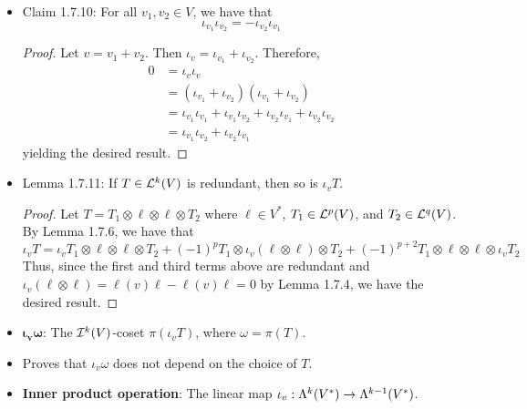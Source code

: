 \documentclass[../notes.tex]{subfiles}
\begin{document}
\begin{itemize}
\begin{proof}
        \begin{equation*}
            \iota_v(\iota_v(T\otimes\ell)) = \iota_v(\iota_vT)\otimes\ell+(-1)^{k-2}\ell(v)\iota_vT+(-1)^{k-1}\ell(v)\iota_vT
        \end{equation*}
        The first term is zero by the inductive hypothesis, and the second two cancel each other out, as desired.
    \end{proof}
    \item Claim 1.7.10: For all $v_1,v_2\in V$, we have that
    \begin{equation*}
        \iota_{v_1}\iota_{v_2} = -\iota_{v_2}\iota_{v_1}
    \end{equation*}
    \begin{proof}
        Let $v=v_1+v_2$. Then $\iota_v=\iota_{v_1}+\iota_{v_2}$. Therefore,
        \begin{align*}
            0 &= \iota_v\iota_v\tag*{Lemma 1.7.8}\\
            &= (\iota_{v_1}+\iota_{v_2})(\iota_{v_1}+\iota_{v_2})\\
            &= \iota_{v_1}\iota_{v_1}+\iota_{v_1}\iota_{v_2}+\iota_{v_2}\iota_{v_1}+\iota_{v_2}\iota_{v_2}\\
            &= \iota_{v_1}\iota_{v_2}+\iota_{v_2}\iota_{v_1}\tag*{Lemma 1.7.8}
        \end{align*}
        yielding the desired result.
    \end{proof}
    \item Lemma 1.7.11: If $T\in\lin[k]{V}$ is redundant, then so is $\iota_vT$.
    \begin{proof}
        Let $T=T_1\otimes\ell\otimes\ell\otimes T_2$ where $\ell\in V^*$, $T_1\in\lin[p]{V}$, and $T_2\in\lin[q]{V}$. By Lemma 1.7.6, we have that
        \begin{equation*}
            \iota_vT = \iota_vT_1\otimes\ell\otimes\ell\otimes T_2+(-1)^pT_1\otimes\iota_v(\ell\otimes\ell)\otimes T_2+(-1)^{p+2}T_1\otimes\ell\otimes\ell\otimes\iota_vT_2
        \end{equation*}
        Thus, since the first and third terms above are redundant and $\iota_v(\ell\otimes\ell)=\ell(v)\ell-\ell(v)\ell=0$ by Lemma 1.7.4, we have the desired result.
    \end{proof}
    \item $\bm{\iota_v\omega}$: The $\ide[k]{V}$-coset $\pi(\iota_vT)$, where $\omega=\pi(T)$.
    \item Proves that $\iota_v\omega$ does not depend on the choice of $T$.
    \item \textbf{Inner product operation}: The linear map $\iota_v:\lam[k]{V^*}\to\lam[k-1]{V^*}$.

\end{itemize}
\end{document}
